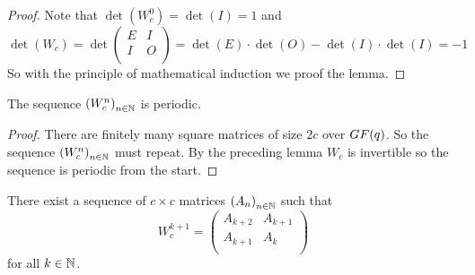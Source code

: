 \begin{proof}
  Note that $\det(W_{c}^{0}) = \det(I) = 1$ and 
  \[
  \det(W_{c}) = \det
  \left(
  \begin{array}{cc}
    E & I \\
    I & O \\
  \end{array}
  \right)
  =
  \det(E) \cdot \det(O) - \det(I) \cdot \det(I)
  =
  -1
  \]
  So with the principle of mathematical induction we proof the lemma.
\end{proof}

\begin{theorem}
  The sequence $\left(W_{c}^{n}\right)_{n\in\mathbb{N}}$ is periodic.
\end{theorem}

\begin{proof}
  There are finitely many square matrices of size $2c$ over
  $GF(q)$. So the sequence $\left(W_{c}^{n}\right)_{n\in\mathbb{N}}$ must
  repeat. By the preceding lemma $W_{c}$ is invertible so the
  sequence is periodic from the start.
\end{proof}

\begin{lemma}[$W$-structure]
  There exist a sequence of $c \times c$ matrices
  $\left(A_{n}\right)_{n\in\mathbb{N}}$ such that
  \[
  W_{c}^{k+1}
  =
  \left(
  \begin{array}{cc}
    A_{k+2} & A_{k+1} \\
    A_{k+1} & A_{k}   \\
  \end{array}
  \right)  
  \]
  for all $k\in\mathbb{N}$.
\end{lemma}

